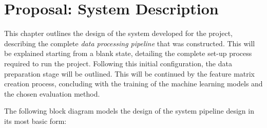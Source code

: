\documentclass[12pt]{report} %
\begin{document}




\chapter{Proposal: System Description}
\label{chap:03}
This chapter outlines the design of the system developed for the project, describing the complete \textit{data processing pipeline} that was constructed. This will be explained starting from a blank state, detailing the complete set-up process required to run the project. Following this initial configuration, the data preparation stage will be outlined. This will be continued by the feature matrix creation process, concluding with the training of the machine learning models and the chosen evaluation method.

The following block diagram models the design of the system pipeline design in its most basic form:


\end{document}
